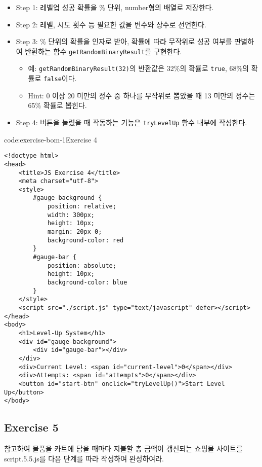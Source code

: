 \begin{itemize}
    \item Step 1: 레벨업 성공 확률을 \% 단위, number형의 배열로 저장한다. 
    \item Step 2: 레벨, 시도 횟수 등 필요한 값을 변수와 상수로 선언한다.
    \item Step 3: \% 단위의 확률을 인자로 받아, 확률에 따라 무작위로 성공 여부를 판별하여 반환하는 함수 \texttt{getRandomBinaryResult}를 구현한다.
    \begin{itemize}
        \item 예: \texttt{getRandomBinaryResult(32)}의 반환값은 32\%의 확률로 \texttt{true}, 68\%의 확률로 \texttt{false}이다.
        \item Hint: 0 이상 20 미만의 정수 중 하나를 무작위로 뽑았을 때 13 미만의 정수는 65\% 확률로 뽑힌다.
    \end{itemize}
    \item Step 4: 버튼을 눌렀을 때 작동하는 기능은 \texttt{tryLevelUp} 함수 내부에 작성한다.
\end{itemize}

\begin{codeenv}{code:exercise-bom-1}{Exercise 4}\begin{verbatim}
<!doctype html>
<head>
    <title>JS Exercise 4</title>
    <meta charset="utf-8">
    <style>
        #gauge-background {
            position: relative;
            width: 300px;
            height: 10px;
            margin: 20px 0;
            background-color: red
        }
        #gauge-bar {
            position: absolute;
            height: 10px;
            background-color: blue
        }
    </style>
    <script src="./script.js" type="text/javascript" defer></script>
</head>
<body>
    <h1>Level-Up System</h1>
    <div id="gauge-background">
        <div id="gauge-bar"></div>
    </div>
    <div>Current Level: <span id="current-level">0</span></div>
    <div>Attempts: <span id="attempts">0</span></div>
    <button id="start-btn" onclick="tryLevelUp()">Start Level Up</button>
</body>
\end{verbatim}
\end{codeenv}

\subsection*{Exercise 5}

\을 참고하여 물품을 카트에 담을 때마다 지불할 총 금액이 갱신되는 쇼핑몰 사이트를 script.5.5.js를 다음 단계를 따라 작성하여 완성하여라.

